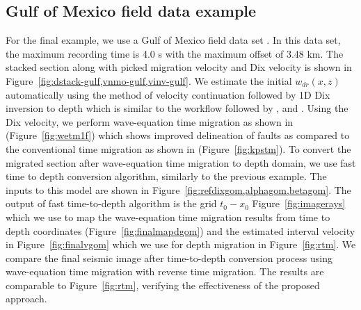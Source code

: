 \subsection{Gulf of Mexico field data example}
For the final example, we use a Gulf of Mexico field data set \cite[]{claerbout1995basic}. In this data set, the maximum recording time is 4.0 s with the maximum offset of 3.48 km. The stacked section along with picked migration velocity and Dix velocity is shown in Figure~\ref{fig:dstack-gulf,vnmo-gulf,vinv-gulf}. We estimate the initial $w_{dr}(x,z)$ automatically using the method of velocity continuation \cite[]{fomel2003time} followed by 1D Dix inversion to depth which is similar to the workflow  followed by \cite{siwei2}, and \cite{sripanich2018fast}. Using the Dix velocity, we perform wave-equation time migration as shown in (Figure~\ref{fig:wetm1f}) which shows improved delineation of faults as compared to the conventional  time migration as shown in (Figure~\ref{fig:kpstm}). To convert the migrated section after wave-equation time migration to depth domain, we use fast time to depth conversion algorithm, similarly to the previous example. The inputs to this model are shown in Figure~\ref{fig:refdixgom,alphagom,betagom}. The output of fast time-to-depth algorithm is the grid $t_0-x_0$ Figure~\ref{fig:imagerays}  which we use to map the wave-equation time migration results from time to depth coordinates (Figure~\ref{fig:finalmapdgom}) and the estimated interval velocity in Figure~\ref{fig:finalvgom} which we use for depth migration in Figure~\ref{fig:rtm}. We compare the final seismic image after time-to-depth conversion process using wave-equation time migration with reverse time migration. The results are comparable to Figure~\ref{fig:rtm}, verifying the effectiveness of the proposed approach.
